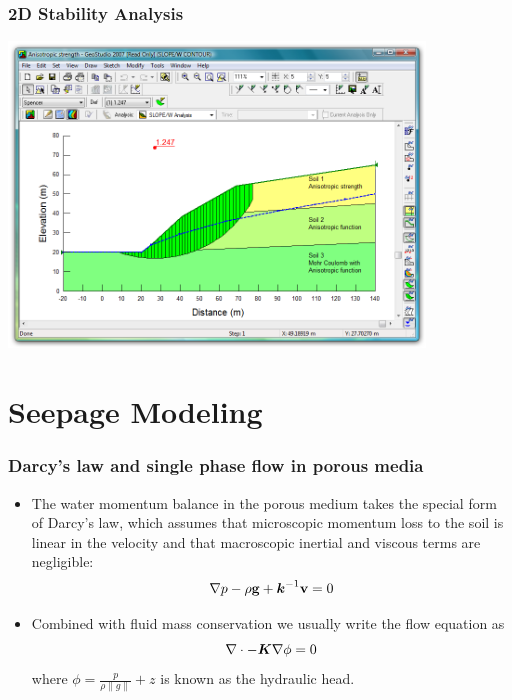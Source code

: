 \documentclass{beamer}
\begin{document}
\begin{frame}
\frametitle{2D Stability Analysis}
\includegraphics[width=4.35in]{screen-slope-full.png}
\end{frame}  

\section{Seepage Modeling}

\begin{frame}
  \frametitle{Darcy's law and single phase flow in porous media}
  \begin{itemize}
    \item The water momentum balance in the porous medium takes the
      special form of Darcy's law, which assumes that microscopic
      momentum loss to the soil is linear in the velocity and that
      macroscopic inertial and viscous terms are negligible:
    \begin{equation}
      \nabla p - \rho {\bf g}  + \mbox{{\boldmath ${k}$}}^{-1} {\bf v} = 0
    \end{equation}
    \item Combined with fluid mass conservation we usually write the flow equation as
      \begin{equation}
        \nabla \cdot  -\mbox{{\boldmath ${K}$}} \nabla \phi = 0 
      \end{equation}
      where $\phi = \frac{p}{\rho\|g\|} + z$ is known as the hydraulic head.
  \end{itemize}
\end{frame}
\end{document}
